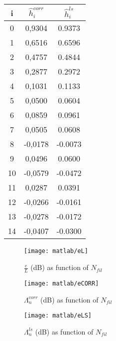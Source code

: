 \documentclass[a4paper,oneside]{article}
\renewcommand{\vec}[1]{\underline{#1}}
\begin{document}
\begin{table}
\centering
  	 												 
\begin{tabular}{|c|c|c|}
\hline
i & $ \hat{h}_i^{corr} $            & $\hat{h}_i^{ls} $          \\
\hline
0 &	0,9304	& 0.9373\\
\hline
1 &	0,6516	& 0.6596\\
\hline
2 &	0,4757	& 0.4844\\
\hline
3 &	0,2877	& 0.2972\\
\hline
4 &	0,1031	& 0.1133\\
\hline
5 &	0,0500	& 0.0604\\
\hline
6 &	0,0859	& 0.0961\\
\hline
7 &	0,0505	& 0.0608\\
\hline
8 &	-0,0178	& -0.0073\\
\hline
9 &	0,0496	& 0.0600\\
\hline
10 &	 -0,0579	& -0.0472\\
\hline
11 &	 0,0287	& 0.0391\\
\hline
12 &	 -0,0266 	& -0.0161\\
\hline
13 &	 -0,0278 	&-0.0172\\
\hline
14 &	 -0,0407 	& -0.0300\\
\hline
\end{tabular}
\end{table}
\begin{figure}[htbp]
  \centering
  \texttt{[image: matlab/eL]}
  \caption{$\frac{e}{L}$ (dB) as function of $N_{fil}$}
    \label{plot:eL}
\end{figure}

\begin{figure}[htbp]
  \centering
  \texttt{[image: matlab/eCORR]}
  \caption{$\Lambda_n^{corr}$ (dB) as function of $N_{fil}$}
    \label{plot:snrCORR}
\end{figure}
\begin{figure}[htbp]
  \centering
  \texttt{[image: matlab/eLS]}
  \caption{$\Lambda_n^{ls}$ (dB) as function of $N_{fil}$}
  
    \label{plot:snrLS}
\end{figure}
\end{document}
